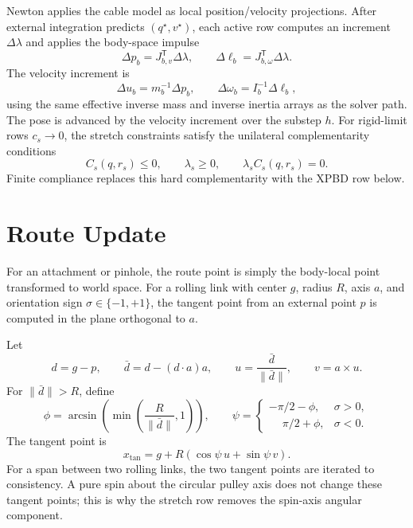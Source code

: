 \documentclass[11pt]{article}
\newcommand{\dd}{\Delta}
\newcommand{\T}{\mathsf{T}}
\begin{document}
Newton applies the cable model as local position/velocity projections.  After
external integration predicts $(q^\star,v^\star)$, each active row computes an
increment $\dd\lambda$ and applies the body-space impulse
\[
  \dd p_b = J_{b,v}^\T\dd\lambda,\qquad
  \dd \ell_b = J_{b,\omega}^\T\dd\lambda.
\]
The velocity increment is
\[
  \dd u_b = m_b^{-1}\dd p_b,\qquad
  \dd\omega_b = I_b^{-1}\dd\ell_b,
\]
using the same effective inverse mass and inverse inertia arrays as the solver
path.  The pose is advanced by the velocity increment over the substep $h$.
For rigid-limit rows $c_s\to 0$, the stretch constraints satisfy the unilateral
complementarity conditions
\begin{equation}
  C_s(q,r_s)\le 0,\qquad \lambda_s\ge 0,\qquad
  \lambda_s C_s(q,r_s)=0.
\end{equation}
Finite compliance replaces this hard complementarity with the XPBD row below.

\section{Route Update}

For an attachment or pinhole, the route point is simply the body-local point
transformed to world space.  For a rolling link with center $g$, radius $R$,
axis $a$, and orientation sign $\sigma\in\{-1,+1\}$, the tangent point from an
external point $p$ is computed in the plane orthogonal to $a$.

Let
\[
  d = g-p,\qquad
  \bar d = d - (d\cdot a)a,\qquad
  u = \frac{\bar d}{\|\bar d\|},\qquad
  v = a\times u.
\]
For $\|\bar d\|>R$, define
\[
  \phi = \arcsin\!\left(\min\left(\frac{R}{\|\bar d\|},1\right)\right),
  \qquad
  \psi =
  \begin{cases}
    -\pi/2-\phi, & \sigma>0,\\
    \phantom{-}\pi/2+\phi, & \sigma<0.
  \end{cases}
\]
The tangent point is
\begin{equation}
  x_\mathrm{tan}=g+R(\cos\psi\,u+\sin\psi\,v).
\end{equation}
For a span between two rolling links, the two tangent points are iterated to
consistency.  A pure spin about the circular pulley axis does not change these
tangent points; this is why the stretch row removes the spin-axis angular
component.
\end{document}
